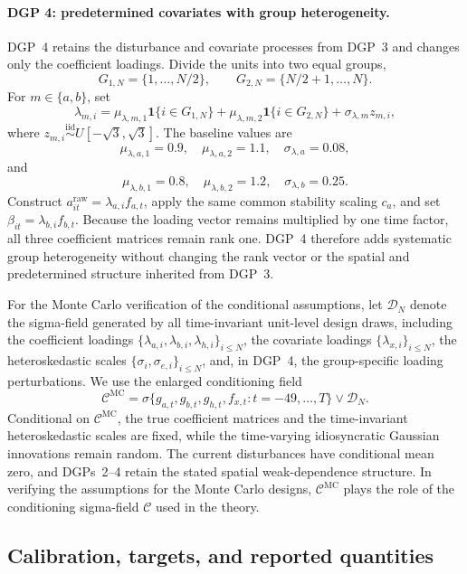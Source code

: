 \documentclass[11pt]{article}
\numberwithin{equation}{section}
\theoremstyle{remark}
\begin{document}
\paragraph{DGP 4: predetermined covariates with group heterogeneity.}
DGP~4 retains the disturbance and covariate processes from DGP~3 and changes only the coefficient loadings. Divide the units into two equal groups,
$$
G_{1,N}=\{1,\ldots,N/2\},
\qquad
G_{2,N}=\{N/2+1,\ldots,N\}.
$$
For $m\in\{a,b\}$, set
$$
\lambda_{m,i}
=
\mu_{\lambda,m,1}\mathbf 1\{i\in G_{1,N}\}
+
\mu_{\lambda,m,2}\mathbf 1\{i\in G_{2,N}\}
+
\sigma_{\lambda,m}z_{m,i},
$$
where $z_{m,i}\stackrel{\mathrm{iid}}{\sim}U[-\sqrt 3,\sqrt 3]$. The baseline values are
$$
\mu_{\lambda,a,1}=0.9,
\quad
\mu_{\lambda,a,2}=1.1,
\quad
\sigma_{\lambda,a}=0.08,
$$
and
$$
\mu_{\lambda,b,1}=0.8,
\quad
\mu_{\lambda,b,2}=1.2,
\quad
\sigma_{\lambda,b}=0.25.
$$
Construct $a_{it}^{\mathrm{raw}}=\lambda_{a,i}f_{a,t}$, apply the same common stability scaling $c_a$, and set $\beta_{it}=\lambda_{b,i}f_{b,t}$. Because the loading vector remains multiplied by one time factor, all three coefficient matrices remain rank one. DGP~4 therefore adds systematic group heterogeneity without changing the rank vector or the spatial and predetermined structure inherited from DGP~3.

For the Monte Carlo verification of the conditional assumptions, let $\mathscr D_N$ denote the sigma-field generated by all time-invariant unit-level design draws, including the coefficient loadings $\{\lambda_{a,i},\lambda_{b,i},\lambda_{h,i}\}_{i\le N}$, the covariate loadings $\{\lambda_{x,i}\}_{i\le N}$, the heteroskedastic scales $\{\sigma_i,\sigma_{e,i}\}_{i\le N}$, and, in DGP~4, the group-specific loading perturbations. We use the enlarged conditioning field
$$
\mathscr C^{\mathrm{MC}}
=
\sigma\{g_{a,t},g_{b,t},g_{h,t},f_{x,t}:t=-49,\ldots,T\}
\vee
\mathscr D_N.
$$
Conditional on $\mathscr C^{\mathrm{MC}}$, the true coefficient matrices and the time-invariant heteroskedastic scales are fixed, while the time-varying idiosyncratic Gaussian innovations remain random. The current disturbances have conditional mean zero, and DGPs~2--4 retain the stated spatial weak-dependence structure. In verifying the assumptions for the Monte Carlo designs, $\mathscr C^{\mathrm{MC}}$ plays the role of the conditioning sigma-field $\mathscr C$ used in the theory.

\subsection{Calibration, targets, and reported quantities}
\end{document}

